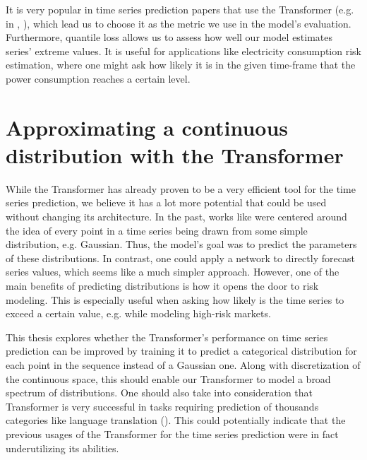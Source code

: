 \documentclass[en]{pracamgr}
\newcommand{\pk}[1]{\textcolor{red}{\small [pk: #1]}}
\begin{document}
	It is very popular in time series prediction papers that use the Transformer (e.g. in \cite{enhancing}, \cite{deepar}), which lead us to choose it as the metric we use in the model's evaluation. Furthermore, quantile loss allows us to assess how well our model estimates series' extreme values. It is useful for applications like electricity consumption risk estimation, where one might ask how likely it is in the given time-frame that the power consumption reaches a certain level.
	
	\chapter{Approximating a continuous distribution with the Transformer}
	
	While the Transformer has already proven to be a very efficient tool for the time series prediction, we believe it has a lot more potential that could be used without changing its architecture. In the past, works like \cite{enhancing} were centered around the idea of every point in a time series being drawn from some simple distribution, e.g. Gaussian. Thus, the model's goal was to predict the parameters of these distributions.
	In contrast, one could apply a network to directly forecast series values, which seems like a much simpler approach. However, one of the main benefits of predicting distributions is how it opens the door to risk modeling. This is especially useful when asking how likely is the time series to exceed a certain value, e.g. while modeling high-risk markets.
	
	This thesis explores whether the Transformer's performance on time series prediction can be improved by training it to predict a categorical distribution for each point in the sequence instead of a Gaussian one. 
	 Along with discretization of the continuous space,
	 this should enable our Transformer to model a broad spectrum of distributions. One should also take into consideration that Transformer is very successful in tasks requiring prediction of thousands categories like language translation (\cite{tr}). This could potentially indicate that the previous usages of the Transformer for the time series prediction were in fact underutilizing its abilities.
	
	
	
\end{document}
